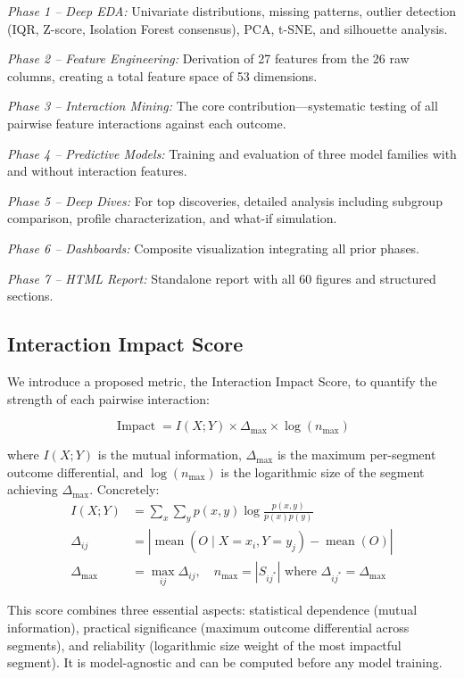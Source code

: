 \documentclass[conference]{IEEEtran}
\begin{document}
\textit{Phase 1 -- Deep EDA:} Univariate distributions, missing patterns, outlier detection (IQR, Z-score, Isolation Forest consensus), PCA, t-SNE, and silhouette analysis.

\textit{Phase 2 -- Feature Engineering:} Derivation of 27 features from the 26 raw columns, creating a total feature space of 53 dimensions.

\textit{Phase 3 -- Interaction Mining:} The core contribution---systematic testing of all pairwise feature interactions against each outcome.

\textit{Phase 4 -- Predictive Models:} Training and evaluation of three model families with and without interaction features.

\textit{Phase 5 -- Deep Dives:} For top discoveries, detailed analysis including subgroup comparison, profile characterization, and what-if simulation.

\textit{Phase 6 -- Dashboards:} Composite visualization integrating all prior phases.

\textit{Phase 7 -- HTML Report:} Standalone report with all 60 figures and structured sections.

\subsection{Interaction Impact Score}

We introduce a proposed metric, the Interaction Impact Score, to quantify the strength of each pairwise interaction:

\begin{equation}
\operatorname{Impact}= I(X;Y) \times \Delta_{\max} \times \log(n_{\max})
\label{eq:impact}
\end{equation}

where $I(X;Y)$ is the mutual information, $\Delta_{\max}$ is the maximum per-segment outcome differential, and $\log(n_{\max})$ is the logarithmic size of the segment achieving $\Delta_{\max}$. Concretely:
\[
\begin{aligned}
I(X;Y) &= \sum_x \sum_y p(x,y) \log\frac{p(x,y)}{p(x)p(y)} \\
\Delta_{ij} &= |\operatorname{mean}(O \mid X=x_i, Y=y_j) - \operatorname{mean}(O)| \\
\Delta_{\max} &= \max_{ij} \Delta_{ij}, \quad n_{\max} = |S_{ij^*}| \text{ where } \Delta_{ij^*} = \Delta_{\max}
\end{aligned}
\]

This score combines three essential aspects: statistical dependence (mutual information), practical significance (maximum outcome differential across segments), and reliability (logarithmic size weight of the most impactful segment). It is model-agnostic and can be computed before any model training.
\end{document}
